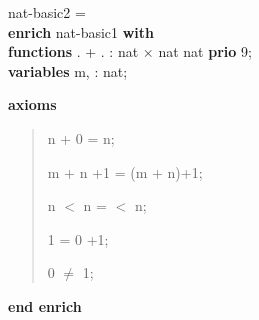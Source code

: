 \begin{tabbing}\label{nat-basic2-spec}%
nat-basic2 = \\
{\bf enr}\={\bf ich} nat-basic1 {\bf with}\+\\
{\bf functions} . + .  : nat $\times$ nat \Imp  nat  {\bf prio} 9;\\
{\bf variables} m, : nat;
\end{tabbing}
{\bf axioms}



\begin{quote}
n + 0 = n;

m + n +1 = (m + n)+1;

n $<$  \Or n =  \Or {} $<$ n;

1 = 0 +1;

0 $\neq$ 1;


\end{quote}
{\bf end enrich}

